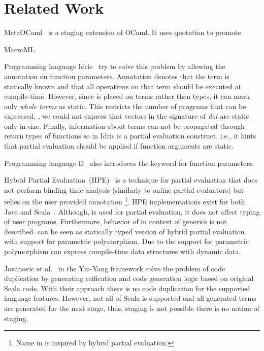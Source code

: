 \section{Related Work}
\label{sct:related-work}

MetaOCaml~\cite{taha_multi-stage_1997,calcagno2003implementing} is a staging extension
of OCaml. It uses quotation to promote

MacroML~\cite{ganz2001macros}


 Programming language Idris~\cite{brady2010scrapping} try to solve this problem by allowing
  the  annotation on function parameters. Annotation  denotes
  that the term is statically known and that all operations on that term should
  be executed at compile-time. However, since  is placed on terms rather
  then types, it can mark only \emph{whole terms} as static. This restricts the number
  of programs that can be expressed, \eg, we could not express that vectors in the
  signature of \emph{dot} are static only in size. Finally, information about 
  terms can not be propagated through return types of functions so 
  in Idris is a partial evaluation construct, i.e., it hints that partial evaluation
  should be applied if function arguments are static.

Programming language D~\cite{dlang} also introduces the  keyword for function parameters.

\cite{le2004specialization}

Hybrid Partial Evaluation~(HPE)~\cite{shali2011Hybrid} is a technique for partial evaluation that
 does not perform binding time analysis (similarly to online partial evaluators) but relies on the user
 provided annotation \footnote{Name  in \tool is inspired by hybrid partial evaluation.}.
 HPE implementations exist for both Java and Scala~\cite{sherwany2015refactoring}.
 Although,  is used for partial evaluation, it does not affect typing of user programs. Furthermore,
 behavior of  in context of generics is not described. \tool can be seen
 as statically typed version of hybrid partial evaluation with support for parametric polymorphism.
 Due to the support for parametric polymorphism \tool can express compile-time data structures with
 dynamic data.

Jovanovic et al.~\cite{yin-yang} in the Yin-Yang framework solve the problem
 of code duplication by generating reification and code generation logic based on original Scala code.
 With their approach there is no code duplication for the supported language features. However, not all of
 Scala is supported and all generated terms are generated for the next stage, thus,
 staging is not possible there is no notion of staging.

